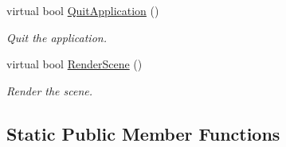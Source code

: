 \begin{DoxyCompactItemize}
virtual bool \hyperlink{class_o_g_l_e_s2_multi_threading_a6f957a568db0e1ab9281296f656a85be}{Quit\+Application} ()
\begin{DoxyCompactList}\small\item\em Quit the application. \end{DoxyCompactList}\item 
virtual bool \hyperlink{class_o_g_l_e_s2_multi_threading_a8fd99a1d7aa4dc66941cd8156c4ae195}{Render\+Scene} ()
\begin{DoxyCompactList}\small\item\em Render the scene. \end{DoxyCompactList}\end{DoxyCompactItemize}
\subsection*{Static Public Member Functions}
